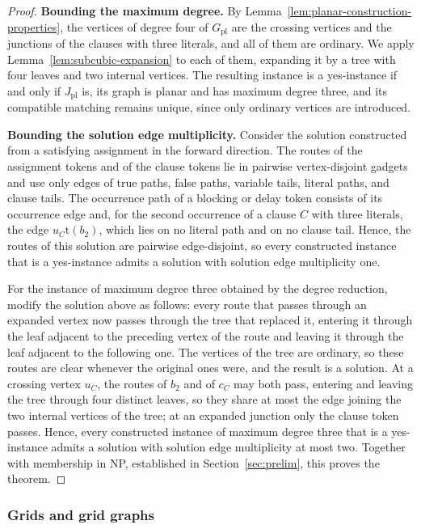 \documentclass[a4paper,USenglish,thm-restate]{lipics-v2021}
\newcommand{\tgt}{\mathrm{t}}
\theoremstyle{problemstyle}
\begin{document}
\begin{proof}
\smallskip
\noindent\textbf{Bounding the maximum degree.}
By Lemma~\ref{lem:planar-construction-properties}, the vertices of degree
four of $G_{\mathrm{pl}}$ are the crossing vertices and the junctions of
the clauses with three literals, and all of them are ordinary. We apply
Lemma~\ref{lem:subcubic-expansion} to each of them, expanding it by a tree
with four leaves and two internal vertices. The resulting instance is a
yes-instance if and only if $J_{\mathrm{pl}}$ is, its graph is planar and
has maximum degree three, and its compatible matching remains unique, since
only ordinary vertices are introduced.

\smallskip
\noindent\textbf{Bounding the solution edge multiplicity.}
Consider the solution constructed from a satisfying assignment in the
forward direction. The routes of the assignment tokens and of the
clause tokens lie in pairwise vertex-disjoint gadgets and use only edges of
true paths, false paths, variable tails, literal paths, and clause tails.
The occurrence path of a blocking or delay token consists of its occurrence
edge and, for the second occurrence of a clause $C$ with three literals,
the edge $u_C\tgt(b_2)$, which lies on no literal path and on no clause
tail. Hence, the routes of this solution are pairwise edge-disjoint, so
every constructed instance that is a yes-instance admits a solution with
solution edge multiplicity one.

For the instance of maximum degree three obtained by the degree reduction,
modify the solution above as follows: every route that passes through an
expanded vertex now passes through the tree that replaced it, entering it
through the leaf adjacent to the preceding vertex of the route and leaving
it through the leaf adjacent to the following one. The vertices of the tree
are ordinary, so these routes are clear whenever the original ones were,
and the result is a solution. At a crossing vertex $u_C$, the routes of
$b_2$ and of $c_C$ may both pass, entering and leaving the tree through four
distinct leaves, so they share at most the edge joining the two internal
vertices of the tree; at an expanded junction only the clause token passes.
Hence, every constructed instance of maximum degree three that is a
yes-instance admits a solution with solution edge multiplicity at most two.
Together with membership in \textsf{NP}, established in
Section~\ref{sec:prelim}, this proves the theorem.
\end{proof}

\subsubsection{Grids and grid graphs}
\label{sec:planar-grids}
\end{document}

